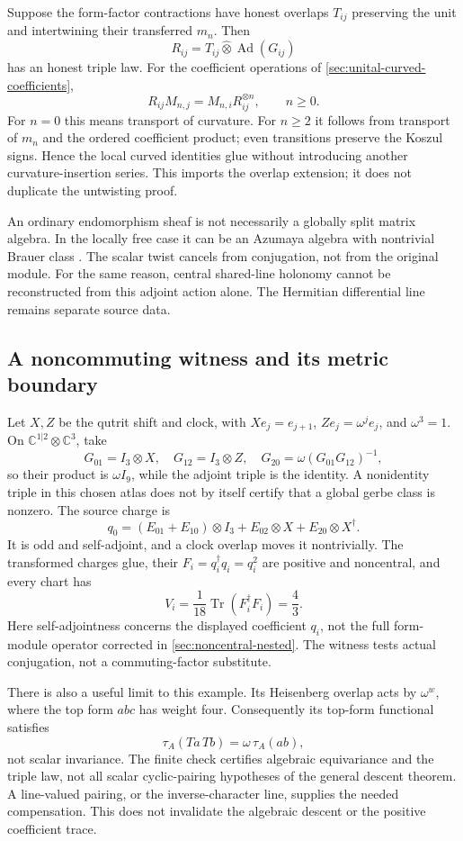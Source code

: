 \documentclass[11pt,a4paper]{article}
\begin{document}
Suppose the form-factor contractions have honest overlaps \(T_{ij}\)
preserving the unit and intertwining their transferred \(m_n\). Then
\[
 R_{ij}=T_{ij}\widehat\otimes\operatorname{Ad}(G_{ij})
\]
has an honest triple law. For the coefficient operations of
\cref{sec:unital-curved-coefficients},
\[
 R_{ij}M_{n,j}=M_{n,i}R_{ij}^{\otimes n},\qquad n\geq0.
\]
For \(n=0\) this means transport of curvature. For \(n\geq2\) it follows
from transport of \(m_n\) and the ordered coefficient product; even
transitions preserve the Koszul signs. Hence the local curved identities
glue without introducing another curvature-insertion series. This imports
the overlap extension; it does not duplicate the untwisting proof.

An ordinary endomorphism sheaf is not necessarily a globally split matrix
algebra. In the locally free case it can be an Azumaya algebra with
nontrivial Brauer class \cite{CaldararuTwisted2000}. The scalar twist
cancels from conjugation, not from the original module. For the same reason,
central shared-line holonomy cannot be reconstructed from this adjoint
action alone. The Hermitian differential line remains separate source data.

\subsection{A noncommuting witness and its metric boundary}
\label{sec:morita-metric-boundary}
Let \(X,Z\) be the qutrit shift and clock, with
\(X e_j=e_{j+1}\), \(Z e_j=\omega^j e_j\), and \(\omega^3=1\).
On \(\mathbb C^{1|2}\otimes\mathbb C^3\), take
\[
 G_{01}=I_3\otimes X,\quad G_{12}=I_3\otimes Z,\quad
 G_{20}=\omega(G_{01}G_{12})^{-1},
\]
so their product is \(\omega I_9\), while the adjoint triple is the
identity. A nonidentity triple in this chosen atlas does not by itself
certify that a global gerbe class is nonzero. The source charge is
\[
 q_0=(E_{01}+E_{10})\otimes I_3
       +E_{02}\otimes X+E_{20}\otimes X^\dagger .
\]
It is odd and self-adjoint, and a clock overlap moves it nontrivially.
The transformed charges glue, their \(F_i=q_i^\dagger q_i=q_i^2\)
are positive and noncentral, and every chart has
\[
 V_i=\frac1{18}\operatorname{Tr}(F_i^\dagger F_i)=\frac43.
\]
Here self-adjointness concerns the displayed coefficient \(q_i\), not
the full form-module operator corrected in \cref{sec:noncentral-nested}.
The witness tests actual conjugation, not a commuting-factor substitute.

There is also a useful limit to this example. Its Heisenberg overlap acts
by \(\omega^{w}\), where the top form \(abc\) has weight four.
Consequently its top-form functional satisfies
\[
 \tau_A(Ta\,Tb)=\omega\,\tau_A(ab),
\]
not scalar invariance. The finite check certifies algebraic equivariance
and the triple law, not all scalar cyclic-pairing hypotheses of the general
descent theorem. A line-valued pairing, or the inverse-character line,
supplies the needed compensation. This does not invalidate the algebraic
descent or the positive coefficient trace.
\end{document}
